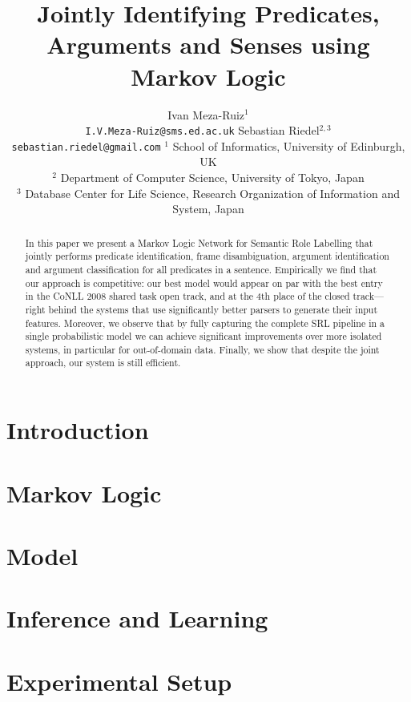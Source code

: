 \documentclass[11pt]{article}
\title{Jointly Identifying Predicates, Arguments and Senses using Markov
Logic}
\author{
Ivan Meza-Ruiz$^{1}$ \\ {\tt I.V.Meza-Ruiz@sms.ed.ac.uk} \And Sebastian Riedel$^{2,3}$ \\ {\tt sebastian.riedel@gmail.com} \AND
${^1}$ {School of Informatics, University of Edinburgh, UK}\\
${^2}$ {Department of Computer Science, University of Tokyo, Japan}\\
${^3}$ {Database Center for Life Science, Research Organization of Information and System, Japan}\\
}
\begin{document}


\maketitle

\begin{abstract}
In this paper we present a Markov Logic Network for Semantic Role
Labelling that jointly performs predicate identification, frame
disambiguation, argument identification and argument classification
for all predicates in a sentence. Empirically we find that our
approach is competitive: our best model would appear on par
with the best entry in the CoNLL 2008 shared task open track, and at
the 4th place of the closed track---right behind the systems that use
significantly better parsers to generate their input features.
Moreover, we observe
that by fully capturing the complete SRL pipeline in a single
probabilistic model we can achieve significant improvements over more isolated systems, in particular for out-of-domain
data. Finally, we show that despite the joint approach, our
system is still efficient. 
\end{abstract} 


\section{Introduction}




\section{Markov Logic} \label{sec:markovlogic}



\section{Model} \label{sec:model} 



\section{Inference and Learning}\label{sec:inference}




\section{Experimental Setup}
\label{sec:experiments}

\end{document}
